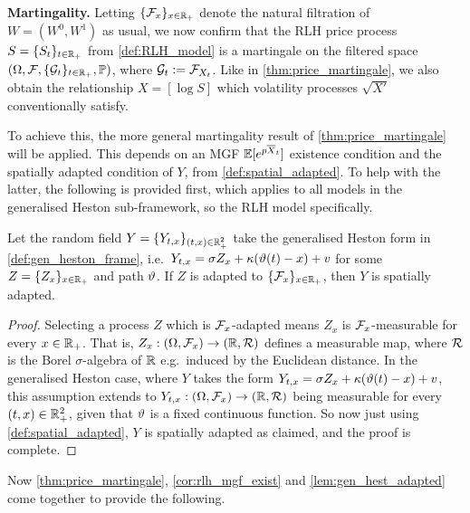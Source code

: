 \vspace{3mm}\textbf{Martingality.} Letting $\{\mathcal{F}_x\}_{x\in\mathbb{R}_+}$ denote the natural filtration of $W=(W^0,W^1)$ as usual, we now confirm that the RLH price process $S=\{S_t\}_{t\in\mathbb{R}_+}$ from \autoref{def:RLH_model} is a martingale on the filtered space $(\Omega,\mathcal{F},\{\mathcal{G}_t\}_{t\in\mathbb{R}_+},\mathbb{P})$, where $\mathcal{G}_t:=\mathcal{F}_{X_t}$. Like in \autoref{thm:price_martingale}, we also obtain the relationship $X=[\log S]$ which volatility processes $\sqrt{X'}$ conventionally satisfy.

To achieve this, the more general martingality result of \autoref{thm:price_martingale} will be applied. This depends on an MGF $\mathbb{E}[e^{p{\overline{X}}_t}]$ existence condition and the spatially adapted condition of $Y$, from \autoref{def:spatial_adapted}. To help with the latter, the following is provided first, which applies to all models in the generalised Heston sub-framework, so the RLH model specifically.

\begin{lemma}\label{lem:gen_hest_adapted}
    Let the random field $Y=\{Y_{t,x}\}_{(t,x)\in\mathbb{R}_+^2}$ take the generalised Heston form in \autoref{def:gen_heston_frame}, i.e.~$Y_{t,x} = \sigma Z_x + \kappa(\vartheta(t) - x)+v$ for some $Z=\{Z_x\}_{x\in\mathbb{R}_+}$ and path $\vartheta$.
    If $Z$ is adapted to $\{\mathcal{F}_x\}_{x\in\mathbb{R}_+}$, then $Y$ is spatially adapted.
\end{lemma}
\begin{proof}
    Selecting a process $Z$ which is $\mathcal{F}_x$-adapted means $Z_x$ is $\mathcal{F}_x$-measurable for every $x\in\mathbb{R}_+$. That is, $Z_x:(\Omega,\mathcal{F}_x)\to(\mathbb{R},\mathcal{R})$ defines a measurable map, where $\mathcal{R}$ is the Borel $\sigma$-algebra of $\mathbb{R}$ e.g.~induced by the Euclidean distance. In the generalised Heston case, where $Y$ takes the form $Y_{t,x} = \sigma Z_x + \kappa(\vartheta(t) - x)+v$, this assumption extends to $Y_{t,x}:(\Omega,\mathcal{F}_x)\to(\mathbb{R},\mathcal{R})$ being measurable for every $(t,x)\in\mathbb{R}^2_+$, given that $\vartheta$ is a fixed continuous function. So now just using \autoref{def:spatial_adapted}, $Y$ is spatially adapted as claimed, and the proof is complete.
\end{proof}

Now \autoref{thm:price_martingale}, \autoref{cor:rlh_mgf_exist} and \autoref{lem:gen_hest_adapted} come together to provide the following.

